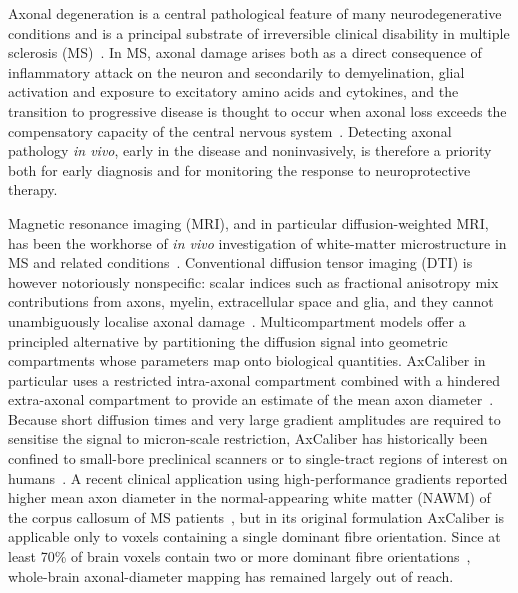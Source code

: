 \documentclass[11pt]{article}
\begin{document}
Axonal degeneration is a central pathological feature of many neurodegenerative conditions and is a principal substrate of irreversible clinical disability in multiple sclerosis (MS)~\cite{criste2014axonal,haines2011axonal}. In MS, axonal damage arises both as a direct consequence of inflammatory attack on the neuron and secondarily to demyelination, glial activation and exposure to excitatory amino acids and cytokines, and the transition to progressive disease is thought to occur when axonal loss exceeds the compensatory capacity of the central nervous system~\cite{criste2014axonal}. Detecting axonal pathology \emph{in vivo}, early in the disease and noninvasively, is therefore a priority both for early diagnosis and for monitoring the response to neuroprotective therapy.

Magnetic resonance imaging (MRI), and in particular diffusion-weighted MRI, has been the workhorse of \emph{in vivo} investigation of white-matter microstructure in MS and related conditions~\cite{inglese2010diffusion}. Conventional diffusion tensor imaging (DTI) is however notoriously nonspecific: scalar indices such as fractional anisotropy mix contributions from axons, myelin, extracellular space and glia, and they cannot unambiguously localise axonal damage~\cite{desantis2014accuracy}. Multicompartment models offer a principled alternative by partitioning the diffusion signal into geometric compartments whose parameters map onto biological quantities. AxCaliber in particular uses a restricted intra-axonal compartment combined with a hindered extra-axonal compartment to provide an estimate of the mean axon diameter~\cite{assaf2008axcaliber,alexander2010orientationally,sepehrband2016towards}. Because short diffusion times and very large gradient amplitudes are required to sensitise the signal to micron-scale restriction, AxCaliber has historically been confined to small-bore preclinical scanners or to single-tract regions of interest on humans~\cite{jones2018microstructural,barazany2009invivo}. A recent clinical application using high-performance gradients reported higher mean axon diameter in the normal-appearing white matter (NAWM) of the corpus callosum of MS patients~\cite{desantis2019whole}, but in its original formulation AxCaliber is applicable only to voxels containing a single dominant fibre orientation. Since at least 70\% of brain voxels contain two or more dominant fibre orientations~\cite{jeurissen2013investigating}, whole-brain axonal-diameter mapping has remained largely out of reach.
\end{document}
